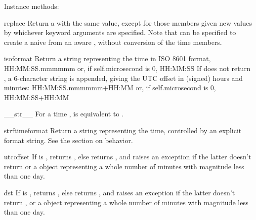 Instance methods:

\begin{methoddesc}{replace}{}
  Return a  with the same value, except for those members given
  new values by whichever keyword arguments are specified.  Note that
   can be specified to create a naive  from
  an aware , without conversion of the time members.
\end{methoddesc}

\begin{methoddesc}{isoformat}{}
  Return a string representing the time in ISO 8601 format,
      HH:MM:SS.mmmmmm
  or, if self.microsecond is 0,
      HH:MM:SS
  If  does not return , a 6-character
  string is appended, giving the UTC offset in (signed) hours and
  minutes:
      HH:MM:SS.mmmmmm+HH:MM
  or, if self.microsecond is 0,
      HH:MM:SS+HH:MM
\end{methoddesc}

\begin{methoddesc}{__str__}{}
  For a time ,  is equivalent to
  .
\end{methoddesc}

\begin{methoddesc}{strftime}{format}
  Return a string representing the time, controlled by an explicit
  format string.  See the section on  behavior.
\end{methoddesc}

\begin{methoddesc}{utcoffset}{}
  If  is , returns , else
  returns , and
  raises an exception if the latter doesn't return  or
  a  object representing a whole number of minutes
  with magnitude less than one day.
\end{methoddesc}

\begin{methoddesc}{dst}{}
  If  is , returns , else
  returns , and
  raises an exception if the latter doesn't return , or
  a  object representing a whole number of minutes
  with magnitude less than one day.
\end{methoddesc}

